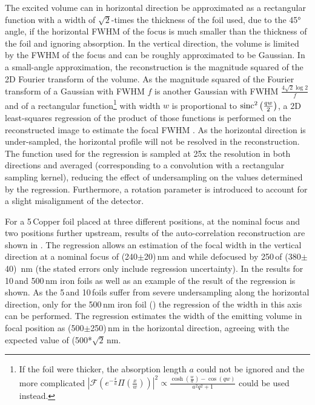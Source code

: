 The excited volume can in horizontal direction be approximated as a rectangular function with a width of $\sqrt{2}$-times the thickness of the foil used, due to the 45° angle, if the horizontal FWHM of the focus is much smaller than the thickness of the foil and ignoring absorption.  In the vertical direction, the volume is limited by the FWHM of the focus and can be roughly approximated to be Gaussian. 
In a small-angle approximation, the reconstruction is the magnitude squared of the 2D Fourier transform of the volume. As the magnitude squared of the Fourier transform of a Gaussian with FWHM $f$ is another Gaussian with FWHM $\frac{4\sqrt{2}\log{2}}{f}$ and of a rectangular function\footnote{If the foil were thicker, the absorption length $a$ could not be ignored and the more complicated $\left|\mathscr{F}\left(e^{-\frac{x}{a}} \Pi \left(\frac{x}{w}\right)\right)\right|^2 \propto \frac{\cosh \left(\frac{w}{a}\right)-\cos (q w)}{a^2 q^2+1}$
	could be used instead.} with width $w$ is proportional to $\operatorname{sinc}^2{\left(\frac{q w}{2}\right)}$, a 2D least-squares regression of the product of those functions is performed on the reconstructed image to estimate the focal FWHM \cite{butz2015}. As the horizontal direction is under-sampled, the horizontal profile will not be resolved in the reconstruction.  The function used for the regression is sampled at 25x the resolution in both directions and averaged (corresponding to a convolution with a rectangular sampling kernel), reducing the effect of undersampling on the values determined by the regression. Furthermore, a rotation parameter is introduced to account for a slight misalignment of the detector.

For a 5\,\micrometer Copper foil placed at three different positions, at the nominal focus and two positions further upstream, results of the auto-correlation reconstruction are shown in .
The regression allows an estimation of the focal width in the vertical direction at a nominal focus of (240$\pm$20)\,nm and while defocused by 250\,\micrometer of (380$\pm$40)\, nm (the stated errors only include regression uncertainty). In  the results for 10\,\micrometer and 500\,nm iron foils as well as an example of the result of the regression is shown. As the 5\,\micrometer and 10\,\micrometer foils suffer from severe undersampling along the horizontal direction, only for the 500\,nm iron foil () the regression of the width in this axis can be performed. The regression estimates the width of the emitting volume in focal position as (500$\pm$250)\,nm in the horizontal direction, agreeing with the expected value of (500*$\sqrt{2}$\,nm.

